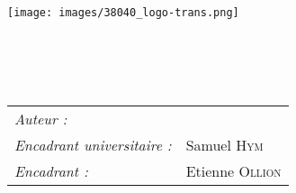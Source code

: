 
\begin{titlepage}

\begin{center}

\texttt{[image: images/38040\_logo-trans.png]}\\[2.5cm]


\textsc{\Large \reportsubject}\\[0.5cm]
\HRule \\[0.4cm]
{\huge \reporttitle}\\[0.4cm]
\HRule \\[1.5cm]


\medskip

\begin{flushleft}
	\begin{tabular}{ll}
	\emph{Auteur :} & \reportauthor \\
	\emph{Encadrant universitaire :} & Samuel \textsc{Hym} \\
	\emph{Encadrant :} & Etienne \textsc{Ollion} \\
	\end{tabular}
\end{flushleft}


\end{center}
\end{titlepage}
